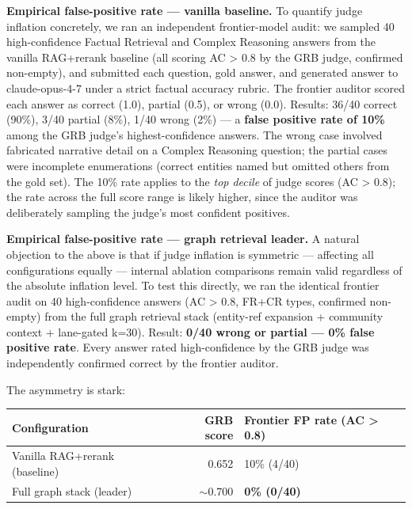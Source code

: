 \textbf{Empirical false-positive rate --- vanilla baseline.} To quantify judge inflation concretely, we ran an independent frontier-model audit: we sampled 40 high-confidence Factual Retrieval and Complex Reasoning answers from the vanilla RAG+rerank baseline (all scoring AC \textgreater{} 0.8 by the GRB judge, confirmed non-empty), and submitted each question, gold answer, and generated answer to claude-opus-4-7 under a strict factual accuracy rubric. The frontier auditor scored each answer as correct (1.0), partial (0.5), or wrong (0.0). Results: 36/40 correct (90\%), 3/40 partial (8\%), 1/40 wrong (2\%) --- a \textbf{false positive rate of 10\%} among the GRB judge's highest-confidence answers. The wrong case involved fabricated narrative detail on a Complex Reasoning question; the partial cases were incomplete enumerations (correct entities named but omitted others from the gold set). The 10\% rate applies to the \emph{top decile} of judge scores (AC \textgreater{} 0.8); the rate across the full score range is likely higher, since the auditor was deliberately sampling the judge's most confident positives.

\textbf{Empirical false-positive rate --- graph retrieval leader.} A natural objection to the above is that if judge inflation is symmetric --- affecting all configurations equally --- internal ablation comparisons remain valid regardless of the absolute inflation level. To test this directly, we ran the identical frontier audit on 40 high-confidence answers (AC \textgreater{} 0.8, FR+CR types, confirmed non-empty) from the full graph retrieval stack (entity-ref expansion + community context + lane-gated k=30). Result: \textbf{0/40 wrong or partial --- 0\% false positive rate}. Every answer rated high-confidence by the GRB judge was independently confirmed correct by the frontier auditor.

The asymmetry is stark:

\begin{small}
\setlength{\tabcolsep}{4pt}
\begin{longtable}{p{2.5in}rp{2.5in}}
\toprule
\textbf{Configuration} & \textbf{GRB score} & \textbf{Frontier FP rate (AC > 0.8)} \\
\midrule
\endhead
Vanilla RAG+rerank (baseline) & 0.652 & 10\% (4/40) \\
Full graph stack (leader) & $\sim$0.700 & \textbf{0\% (0/40)} \\
\bottomrule
\end{longtable}
\end{small}

